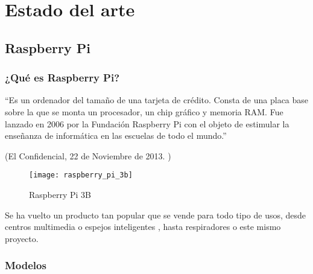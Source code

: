 
\chapter{Estado del arte} %
\label{sec:EstadoDelArte}

    \section{Raspberry Pi} %
    \label{sec:RaspberryPi}

        \subsection{¿Qué es Raspberry Pi?} %
        \label{sub:QueEsRaspberryPi}

            ``Es un ordenador del tamaño de una tarjeta de crédito. Consta de una placa base sobre la que se monta un
            procesador, un chip gráfico y memoria RAM. Fue lanzado en 2006 por la Fundación Raspberry Pi con el objeto
            de estimular la enseñanza de informática en las escuelas de todo el mundo.''

            \begin{flushright}
                (El Confidencial, 22 de Noviembre de 2013. \cite{confidencial_raspberry})
            \end{flushright}

            \begin{figure}[ht]
                \centering
                \texttt{[image: raspberry\_pi\_3b]}
                \caption{Raspberry Pi 3B \cite{imagen_raspberry_pi_3b}\label{fig:ImagenRaspberryPi3B}}
            \end{figure}

            Se ha vuelto un producto tan popular que se vende para todo tipo de usos, desde centros
            multimedia \cite{centro_multimedia_raspberry_pi} o espejos inteligentes \cite{espejo_raspberry_pi}, hasta
            respiradores \cite{github_respirador} o este mismo proyecto.


        \subsection{Modelos} %
        \label{sub:ModelosRaspberryPi}


